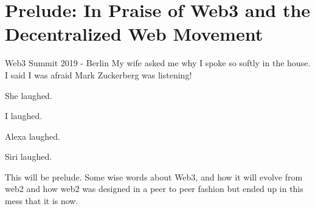 \chapter*{Prelude: In Praise of Web3 and the Decentralized Web Movement}

\begin{chapquote}{Web3 Summit 2019 - Berlin}
	My wife asked me why I spoke so softly in the house. I said I was afraid Mark Zuckerberg was
	listening!

	She laughed.
	
	I laughed.
	
	Alexa laughed.
	
	Siri laughed.
\end{chapquote}

This will be prelude. Some wise words about Web3, and how it will evolve from web2 and how web2 was
designed in a peer to peer fashion but ended up in this mess that it is now.

